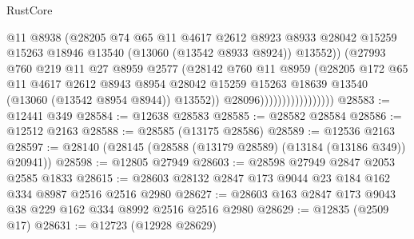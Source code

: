 \begin{lexlean}{RustCore}
\begin{coremodule}
                                      @11
                                      @8938
                                      (@28205
                                        @74
                                        @65
                                        @11
                                        @4617
                                        @2612
                                        @8923
                                        @8933
                                        @28042
                                        @15259
                                        @15263
                                        @18946
                                        @13540
                                        (@13060 (@13542 @8933 @8924))
                                        @13552))
                                    (@27993
                                      @760
                                      @219
                                      @11
                                      @27
                                      @8959
                                      @2577
                                      (@28142
                                        @760
                                        @11
                                        @8959
                                        (@28205
                                          @172
                                          @65
                                          @11
                                          @4617
                                          @2612
                                          @8943
                                          @8954
                                          @28042
                                          @15259
                                          @15263
                                          @18639
                                          @13540
                                          (@13060 (@13542 @8954 @8944))
                                          @13552))
                                      @28096)))))))))))))))))
@28583 := @12441 @349
@28584 := @12638 @28583
@28585 := @28582 @28584
@28586 := @12512 @2163
@28588 := @28585 (@13175 @28586)
@28589 := @12536 @2163
@28597 := @28140 (@28145 (@28588 (@13179 @28589) (@13184 (@13186 @349)) @20941))
@28598 := @12805 @27949
@28603 := @28598 @27949 @2847 @2053 @2585 @1833
@28615 := @28603 @28132 @2847 @173 @9044 @23 @184 @162 @334 @8987 @2516 @2516 @2980
@28627 := @28603 @163 @2847 @173 @9043 @38 @229 @162 @334 @8992 @2516 @2516 @2980
@28629 := @12835 (@2509 @17)
@28631 := @12723 (@12928 @28629)

\end{coremodule}
\end{lexlean}
